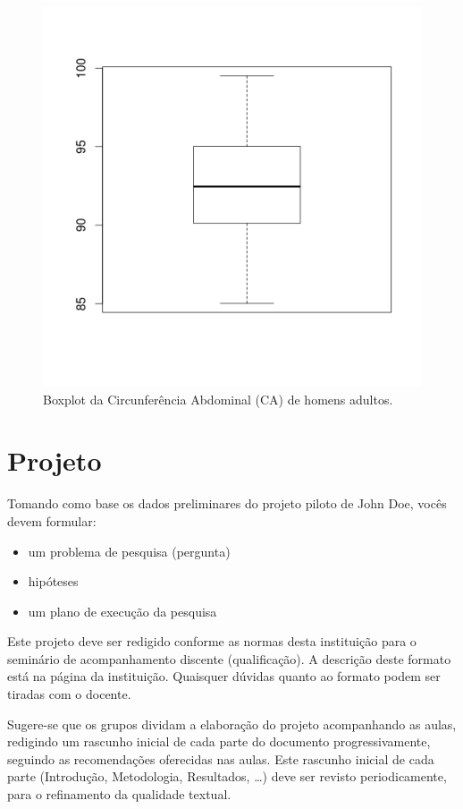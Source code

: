 \documentclass[a4paper]{article}
\begin{document}
\begin{figure}[h]
  \centering
  \includegraphics[width=.5\textwidth]{boxplot}
  \caption{Boxplot da Circunferência Abdominal (CA) de homens
    adultos.}
  \label{fig:boxplot}
\end{figure}


\section{Projeto}

Tomando como base os dados preliminares do projeto piloto de John Doe,
vocês devem formular:

\begin{itemize}
\item um problema de pesquisa (pergunta)
\item hipóteses
\item um plano de execução da pesquisa
\end{itemize}

Este projeto deve ser redigido conforme as normas desta instituição
para o seminário de acompanhamento discente (qualificação). A
descrição deste formato está na página da instituição. Quaisquer
dúvidas quanto ao formato podem ser tiradas com o docente.

Sugere-se que os grupos dividam a elaboração do projeto acompanhando
as aulas, redigindo um rascunho inicial de cada parte do documento
progressivamente, seguindo as recomendações oferecidas nas aulas. Este
rascunho inicial de cada parte (Introdução, Metodologia, Resultados,
\ldots) deve ser revisto periodicamente, para o refinamento da
qualidade textual.
\end{document}
